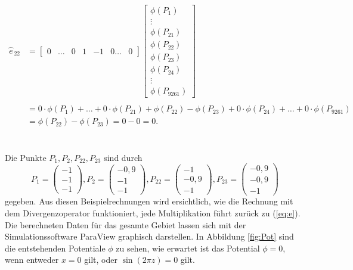 \begin{equation} 
	\begin{split} 
		\overset{\frown}{e}_{22} &=  
		\begin{bmatrix} 
			0 & \dots & 0 & 1 & -1 & 0 \dots & 0 
		\end{bmatrix} 
		\begin{bmatrix} 
			\phi(P_1) \\ \vdots \\ \phi(P_{21}) \\ \phi(P_{22}) \\ \phi(P_{23}) \\ \phi(P_{24}) \\ 	\vdots 	\\ \phi(P_{9261}) 
		\end{bmatrix} 
		\\ \\ 
		&= 0\cdot\phi(P_1) + \dots + 0\cdot\phi(P_{21}) + \phi(P_{22}) - \phi(P_{23}) + 0\cdot\phi(P_{24}) + \dots + 0\cdot\phi(P_{9261}) \\ 
		&= \phi(P_{22}) - \phi(P_{23}) = 0 - 0 = 0. 
	\end{split} 
\end{equation}\\ \\ 
Die Punkte $P_1,P_2,P_{22},P_{23}$ sind durch 
\begin{equation*} 
	P_1 = \begin{pmatrix} 
	-1 \\ -1 \\ -1  
	\end{pmatrix},
	P_2 = \begin{pmatrix} 
	-0,9 \\ -1 \\ -1  
	\end{pmatrix},
	P_{22} = \begin{pmatrix} 
	-1 \\ -0,9 \\ -1
	\end{pmatrix}, 
	P_{23} = \begin{pmatrix} 
	-0,9 \\ -0,9 \\ -1  
	\end{pmatrix}
\end{equation*} gegeben. Aus diesen Beispielrechnungen wird ersichtlich, wie die Rechnung mit dem Divergenzoperator funktioniert, jede Multiplikation führt zurück zu (\ref{eq:e}). 
Die berechneten Daten für das gesamte Gebiet lassen sich mit der Simulationssoftware ParaView graphisch darstellen. In Abbildung \ref{fig:Pot} sind die entstehenden Potentiale $\phi$ zu sehen, wie erwartet ist das Potential $\phi = 0$, wenn entweder $x = 0$ gilt, oder $\sin(2\pi z) = 0$ gilt.\\ \\
